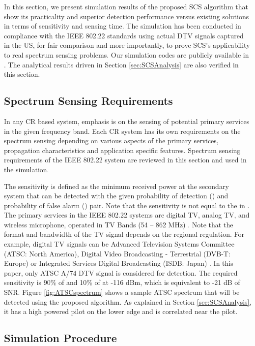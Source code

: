 \documentclass[draftclsnofoot,onecolumn,12pt]{IEEEtran}
\begin{document}
In this section, we present simulation results of the proposed SCS algorithm that show its practicality and superior detection performance versus existing solutions in terms of sensitivity and sensing time. 
The simulation has been conducted in compliance with the IEEE 802.22 standards using actual DTV signals captured in the US, for fair comparison and more importantly, to prove SCS's applicability to real spectrum sensing problems.
Our simulation codes are publicly available in \cite{SCS-CODE-URL}.
The analytical results driven in Section \ref{sec:SCSAnalysis} are also verified in this section.
\subsection{Spectrum Sensing Requirements}
\label{subsec:requirements}


In any CR based system, emphasis is on the sensing of potential primary services in the given frequency band.
Each CR system has its own requirements on the spectrum sensing depending on various aspects of the primary services, propagation characteristics and
application specific features.
Spectrum sensing requirements of the IEEE 802.22 system are reviewed in this section and used in the simulation.

The sensitivity is defined as the minimum received power at the secondary system that can be detected
with the given probability of detection () and  probability of false alarm () pair. Note
that the sensitivity is not equal to the  in \cite{TanSah08}. The primary services in
the IEEE 802.22 systems are digital TV, analog TV, and wireless microphone, operated in TV Bands
(54 -- 862 MHz) \cite{FCC08-260, 802.22_Req}. 
Note that the format and bandwidth of the TV signal depends on the
regional regulation. For example, digital TV signals can be Advanced Television Systems Committee (ATSC: North America),
Digital Video Broadcasting - Terrestrial (DVB-T: Europe)
or Integrated Services Digital Broadcasting (ISDB: Japan) \cite{SteCho09, CorGho07}. In this paper, only ATSC A/74 DTV signal
\cite{ATSC:A74} is considered for detection.
The required sensitivity is 90\% of  and 10\% of  at -116 dBm, which is equivalent to -21 dB of SNR. 
Figure \ref{fig:ATSCspectrum} shows a sample ATSC spectrum that will be detected using the proposed algorithm.
As explained in Section \ref{sec:SCSAnalysis}, it has a high powered pilot on the lower edge and is correlated near the pilot.


\subsection{Simulation Procedure}
\label{subsec:SimProcedure}
\end{document}

